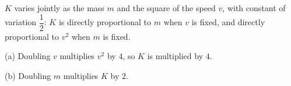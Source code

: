 $K$ varies jointly as the mass $m$ and the square of the speed $v$, with constant of variation $\dfrac{1}{2}$: $K$ is directly proportional to $m$ when $v$ is fixed, and directly proportional to $v^2$ when $m$ is fixed.

(a) Doubling $v$ multiplies $v^2$ by $4$, so $K$ is multiplied by $\boxed{4}$.

(b) Doubling $m$ multiplies $K$ by $\boxed{2}$.
